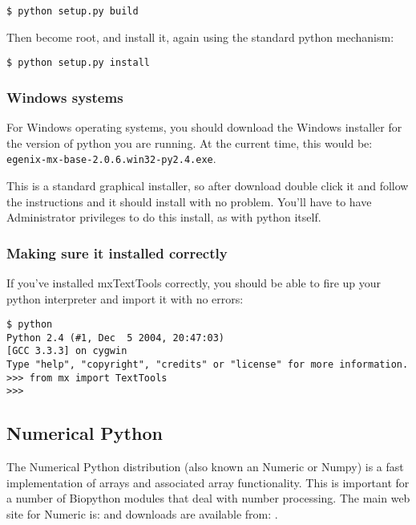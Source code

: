 \documentclass{article}
\begin{document}
\begin{verbatim}
$ python setup.py build
\end{verbatim}

Then become root, and install it, again using the standard python
mechanism:

\begin{verbatim}
$ python setup.py install
\end{verbatim}

\subsubsection{Windows systems}

For Windows operating systems, you should download the Windows installer
for the version of python you are running. At the current time, this
would be: \verb|egenix-mx-base-2.0.6.win32-py2.4.exe|.


This is a standard graphical installer, so after download double click
it and follow the instructions and it should install with no problem.
You'll have to have Administrator privileges to do this install, as with
python itself.

\subsubsection{Making sure it installed correctly}

If you've installed mxTextTools correctly, you should be able to fire up
your python interpreter and import it with no errors:

\begin{verbatim}
$ python
Python 2.4 (#1, Dec  5 2004, 20:47:03)
[GCC 3.3.3] on cygwin
Type "help", "copyright", "credits" or "license" for more information.
>>> from mx import TextTools
>>>
\end{verbatim}

\subsection{Numerical Python}

The Numerical Python distribution (also known an Numeric or Numpy) is a
fast implementation of arrays and associated array functionality. This
is important for a number of Biopython modules that deal with
number processing. The main web site for Numeric is:
 and downloads are
available from:
.
\end{document}
